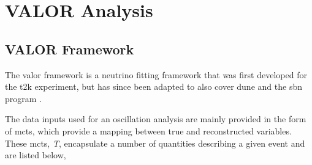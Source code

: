 \chapter{VALOR Analysis}
\label{chap:VALOR}

\section{VALOR Framework}\label{sec:VALOR_framework}

The \gls{valor} framework is a neutrino fitting framework that was first developed for the \gls{t2k} experiment, but has since been adapted to also cover \gls{dune} and the \gls{sbn} program \cite{VALOR}.

The data inputs used for an oscillation analysis are mainly provided in the form of \glspl{mct}, which provide a mapping between true and reconstructed variables. These \glspl{mct}, \textit{T}, encapsulate a number of quantities describing a given event and are listed below,

